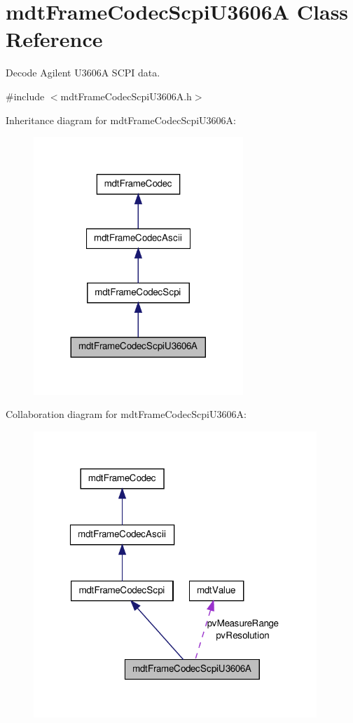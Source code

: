 \hypertarget{classmdt_frame_codec_scpi_u3606_a}{
\section{mdtFrameCodecScpiU3606A Class Reference}
\label{classmdt_frame_codec_scpi_u3606_a}
}


Decode Agilent U3606A SCPI data.  




{\ttfamily \#include $<$mdtFrameCodecScpiU3606A.h$>$}



Inheritance diagram for mdtFrameCodecScpiU3606A:\nopagebreak
\begin{figure}[H]
\begin{center}
\leavevmode
\includegraphics[width=224pt]{classmdt_frame_codec_scpi_u3606_a__inherit__graph}
\end{center}
\end{figure}


Collaboration diagram for mdtFrameCodecScpiU3606A:\nopagebreak
\begin{figure}[H]
\begin{center}
\leavevmode
\includegraphics[width=303pt]{classmdt_frame_codec_scpi_u3606_a__coll__graph}
\end{center}
\end{figure}
